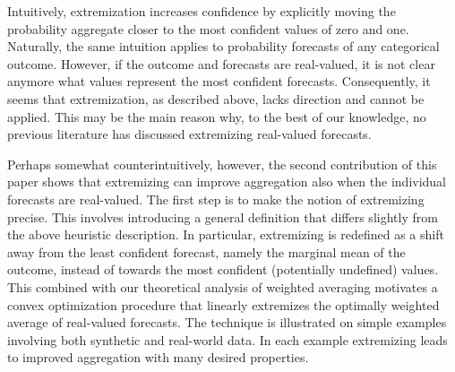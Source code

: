 \documentclass[11pt]{article}
\theoremstyle{definition}
\theoremstyle{definition}
\begin{document}
Intuitively, extremization increases confidence by explicitly moving the probability aggregate closer to  the most confident values of zero and one. 
Naturally, the same intuition applies to probability forecasts of any categorical outcome. 
    However, if the outcome and forecasts are real-valued, it is not clear anymore what values represent the most confident forecasts. Consequently, it seems that extremization, as described above, lacks direction and cannot be applied. 
%    
     This may be the main reason why, to the best of our knowledge, no previous literature has discussed extremizing real-valued forecasts. 
    
    
      Perhaps somewhat counterintuitively, however, the second contribution of this paper shows that extremizing can improve aggregation also when the individual forecasts are real-valued. The first step is to make the notion of extremizing precise. This involves introducing a general definition that differs slightly from the above heuristic description.    
        In particular, extremizing is redefined as a shift away from the least confident forecast, namely the marginal mean of the outcome, instead of towards the most confident (potentially undefined) values.  
%      
%      
This combined with our theoretical analysis of weighted averaging motivates a convex optimization procedure that linearly extremizes the optimally weighted average of real-valued forecasts.
  The technique is illustrated on simple examples involving both synthetic and real-world data. In each example extremizing leads to improved aggregation with many desired properties.
\end{document}
